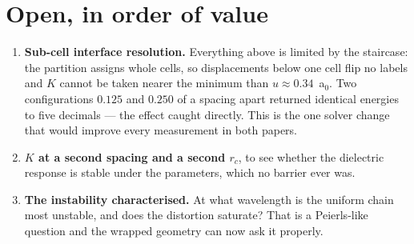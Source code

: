 \documentclass[11pt]{article}
\begin{document}
\section*{Open, in order of value}

\begin{enumerate}\itemsep2pt
\item \textbf{Sub-cell interface resolution.} Everything above is limited by the staircase: the
partition assigns whole cells, so displacements below one cell flip no labels and $K$ cannot be
taken nearer the minimum than $u\approx0.34$~a$_0$. Two configurations $0.125$ and $0.250$ of a
spacing apart returned identical energies to five decimals --- the effect caught directly. This is
the one solver change that would improve every measurement in both papers.
\item \textbf{$K$ at a second spacing and a second $r_c$}, to see whether the dielectric response is
stable under the parameters, which no barrier ever was.
\item \textbf{The instability characterised.} At what wavelength is the uniform chain most unstable,
and does the distortion saturate? That is a Peierls-like question and the wrapped geometry can
now ask it properly.
\end{enumerate}
\end{document}
